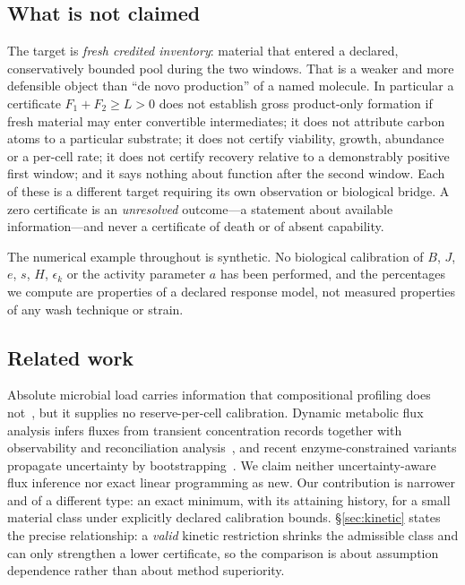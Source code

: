 \documentclass[11pt]{article}
\theoremstyle{plain}
\theoremstyle{definition}
\theoremstyle{remark}
\newcommand{\Lc}{L}
\begin{document}
\subsection{What is not claimed}\label{sec:notclaimed}

The target is \emph{fresh credited inventory}: material that entered a
declared, conservatively bounded pool during the two windows. That is a
weaker and more defensible object than ``de novo production'' of a named
molecule. In particular a certificate $F_1+F_2\ge\Lc>0$ does not establish
gross product-only formation if fresh material may enter convertible
intermediates; it does not attribute carbon atoms to a particular substrate;
it does not certify viability, growth, abundance or a per-cell rate; it does
not certify recovery relative to a demonstrably positive first window; and it
says nothing about function after the second window. Each of these is a
different target requiring its own observation or biological bridge. A zero
certificate is an \emph{unresolved} outcome---a statement about available
information---and never a certificate of death or of absent capability.

The numerical example throughout is synthetic. No biological calibration of
$B$, $J$, $e$, $s$, $H$, $\epsilon_k$ or the activity parameter $a$ has been
performed, and the percentages we compute are properties of a declared
response model, not measured properties of any wash technique or strain.

\subsection{Related work}

Absolute microbial load carries information that compositional profiling does
not~\cite{vandeputte}, but it supplies no reserve-per-cell calibration.
Dynamic metabolic flux analysis infers fluxes from transient concentration
records together with observability and reconciliation
analysis~\cite{leighty}, and recent enzyme-constrained variants propagate
uncertainty by bootstrapping~\cite{pennington}. We claim neither
uncertainty-aware flux inference nor exact linear programming as new. Our
contribution is narrower and of a different type: an exact minimum, with its
attaining history, for a small material class under explicitly declared
calibration bounds. \S\ref{sec:kinetic} states the precise relationship: a
\emph{valid} kinetic restriction shrinks the admissible class and can only
strengthen a lower certificate, so the comparison is about assumption
dependence rather than about method superiority.
\end{document}

